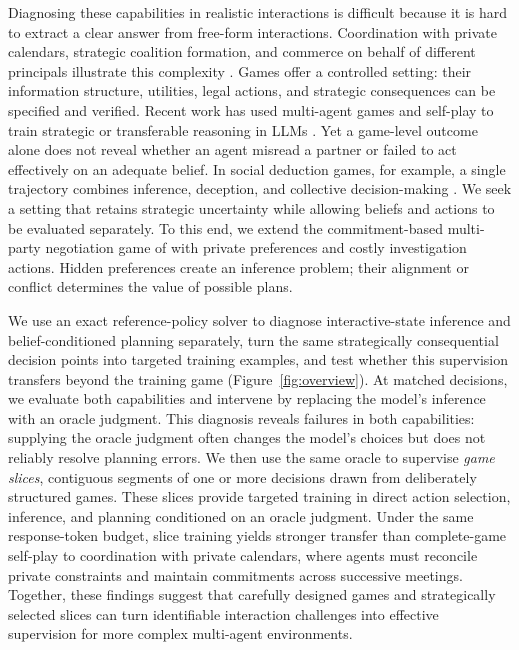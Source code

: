 Diagnosing these capabilities in realistic interactions is difficult because it is hard to extract a clear answer from free-form interactions.
Coordination with private calendars, strategic coalition formation, and
commerce on behalf of different principals illustrate this complexity
\citep{zou2026calbench,oneill2026cooperate,li2026emergent}. Games offer a
controlled setting: their information structure, utilities, legal actions,
and strategic consequences can be specified and verified. Recent work has
used multi-agent games and self-play to train strategic or transferable
reasoning in LLMs
\citep{yuan2026marshal,liu2026spiral,lyu2026gift,he2026stratreasoner}.
Yet a game-level outcome alone does not reveal whether an agent misread a
partner or failed to act effectively on an adequate belief. In social deduction games, for
example, a single trajectory combines inference, deception, and collective
decision-making \citep{light2023avalonbench}. We seek a setting that retains
strategic uncertainty while allowing beliefs and actions to be evaluated
separately. To this end, we extend the commitment-based multi-party negotiation
game of \citet{benac2026benchmark} with private preferences and costly investigation
actions. Hidden preferences create an
inference problem; their alignment or conflict determines the value of
possible plans.

We use an exact reference-policy solver to diagnose interactive-state
inference and belief-conditioned planning separately, turn the same
strategically consequential decision points into targeted training examples,
and test whether this supervision transfers beyond the training game
(Figure~\ref{fig:overview}). At matched decisions, we evaluate both
capabilities and intervene by replacing the model's inference with an oracle
judgment. This diagnosis
reveals failures in both capabilities: supplying the oracle judgment often changes
the model's choices but does not reliably resolve planning errors. We then use
the same oracle to supervise \emph{game slices}, contiguous segments of one
or more decisions drawn from deliberately structured games. These slices
provide targeted training in direct action selection, inference, and planning
conditioned on an oracle judgment. Under the same response-token budget,
slice training yields stronger transfer than complete-game self-play to
coordination with private calendars, where agents must reconcile private
constraints and maintain commitments across successive meetings. Together,
these findings suggest that carefully designed games and strategically
selected slices can turn identifiable interaction challenges into effective
supervision for more complex multi-agent environments.
